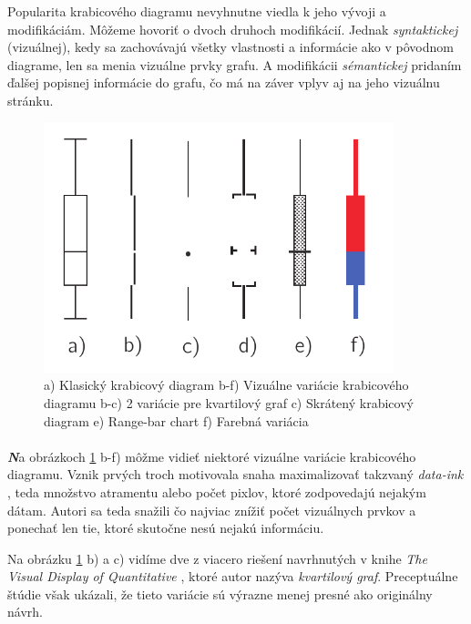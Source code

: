Popularita krabicového diagramu nevyhnutne viedla k jeho vývoji a modifikáciám. Môžeme hovoriť o dvoch druhoch modifikácií. Jednak \textit{syntaktickej} (vizuálnej), kedy sa zachovávajú všetky vlastnosti a informácie ako v pôvodnom diagrame, len sa menia vizuálne prvky grafu. A modifikácii \textit{sémantickej} pridaním ďalšej popisnej informácie do grafu, čo má na záver vplyv aj na jeho vizuálnu stránku.


\begin{figure}
	\centering
	\includegraphics[width = 4in]{boxplot2}
	\caption{ a) Klasický krabicový diagram  b-f) Vizuálne variácie krabicového diagramu b-c) 2 variácie pre kvartilový graf \cite{Tufte83} c) Skrátený krabicový diagram \cite{VisualSummaryPotter} e) \mbox{Range-bar} chart \cite{Spear} f) Farebná variácia \cite{Carr}  }
	\label{fig:boxplotmodif1}
\end{figure}


\paragraph{}
{\large \textbf{\textit{N}}}a obrázkoch \ref{fig:boxplotmodif1} b-f) môžme vidieť niektoré vizuálne variácie krabicového diagramu. Vznik prvých troch motivovala snaha maximalizovať takzvaný \textit{data-ink} \cite{Tufte83}, teda množstvo atramentu alebo počet pixlov, ktoré zodpovedajú nejakým dátam. Autori sa teda snažili čo najviac znížiť počet vizuálnych prvkov a ponechať len tie, ktoré skutočne nesú nejakú informáciu. 

Na obrázku \ref{fig:boxplotmodif1} b) a c) vidíme dve z viacero riešení navrhnutých v knihe \textit{The Visual Display of Quantitative} \cite{Tufte83}, ktoré autor nazýva \textit{kvartilový graf}. Preceptuálne štúdie \cite{Stock} však ukázali, že tieto variácie sú výrazne menej presné ako originálny návrh.

